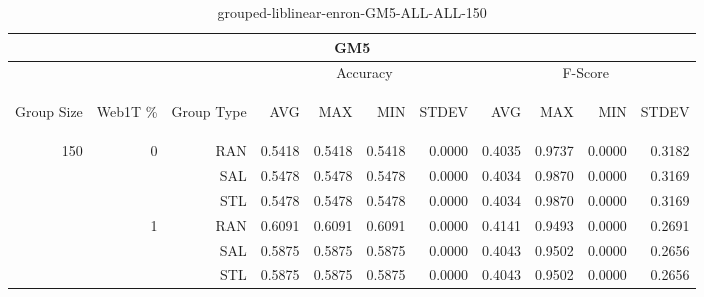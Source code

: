 \begin{center}
\begin{table}[htbp] 
 \begin{center}
\begin{tabular}{ | r | r | r | r | r | r | r | r | r | r | r |}
\hline
\multicolumn{11}{|c|}{GM5}\\
\hline
 & & & \multicolumn{4}{|c|}{Accuracy} & \multicolumn{4}{|c|}{F-Score}\\ \cline{4-11}
\begin{sideways}Group Size\end{sideways} & \begin{sideways}Web1T \%\end{sideways} & \begin{sideways}Group Type\end{sideways} & \begin{sideways}AVG\end{sideways} & \begin{sideways}MAX\end{sideways} & \begin{sideways}MIN\end{sideways} & \begin{sideways}STDEV\end{sideways} & \begin{sideways}AVG\end{sideways} & \begin{sideways}MAX\end{sideways} & \begin{sideways}MIN\end{sideways} & \begin{sideways}STDEV\end{sideways}\\
\hline
\multirow{6}{*}{150}
 & \multirow{3}{*}{0} & RAN & 0.5418 & 0.5418 & 0.5418 & 0.0000 & 0.4035 & 0.9737 & 0.0000 & 0.3182\\ \cline{3-11}
 &   & SAL & 0.5478 & 0.5478 & 0.5478 & 0.0000 & 0.4034 & 0.9870 & 0.0000 & 0.3169\\ \cline{3-11}
 &   & STL & 0.5478 & 0.5478 & 0.5478 & 0.0000 & 0.4034 & 0.9870 & 0.0000 & 0.3169\\ \cline{2-11}
 & \multirow{3}{*}{1} & RAN & 0.6091 & 0.6091 & 0.6091 & 0.0000 & 0.4141 & 0.9493 & 0.0000 & 0.2691\\ \cline{3-11}
 &   & SAL & 0.5875 & 0.5875 & 0.5875 & 0.0000 & 0.4043 & 0.9502 & 0.0000 & 0.2656\\ \cline{3-11}
 &   & STL & 0.5875 & 0.5875 & 0.5875 & 0.0000 & 0.4043 & 0.9502 & 0.0000 & 0.2656\\ \cline{2-11}
\hline
\end{tabular}
\caption{grouped-liblinear-enron-GM5-ALL-ALL-150}
\end{center}
 \end{table}
\end{center}

